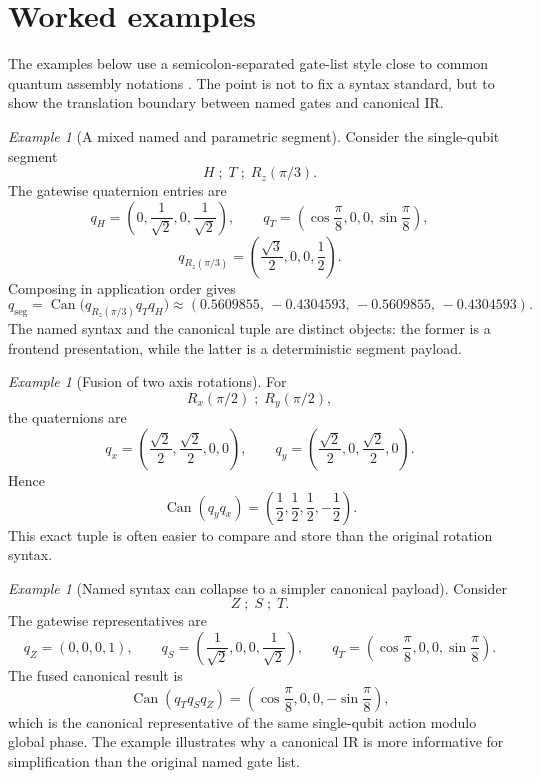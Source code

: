 \documentclass[11pt]{article}
\theoremstyle{remark}
\newtheorem{example}[definition]{Example}
\newcommand{\canon}{\operatorname{Can}}
\begin{document}
\section{Worked examples}

The examples below use a semicolon-separated gate-list style close to common
quantum assembly notations \citep{cross2022,smith2016}. The point is not to
fix a syntax standard, but to show the translation boundary between named gates
and canonical IR.

\begin{example}[A mixed named and parametric segment]
Consider the single-qubit segment
\[
H\;;\;T\;;\;R_z(\pi/3).
\]
The gatewise quaternion entries are
\[
q_H=\left(0,\frac{1}{\sqrt2},0,\frac{1}{\sqrt2}\right),\qquad
q_T=\left(\cos\frac{\pi}{8},0,0,\sin\frac{\pi}{8}\right),
\]
\[
q_{R_z(\pi/3)}=\left(\frac{\sqrt3}{2},0,0,\frac12\right).
\]
Composing in application order gives
\[
q_{\mathrm{seg}}=
\canon\!\bigl(q_{R_z(\pi/3)} q_T q_H\bigr)
\approx
(0.5609855,\,-0.4304593,\,-0.5609855,\,-0.4304593).
\]
The named syntax and the canonical tuple are distinct objects: the former is a
frontend presentation, while the latter is a deterministic segment payload.
\end{example}

\begin{example}[Fusion of two axis rotations]
For
\[
R_x(\pi/2)\;;\;R_y(\pi/2),
\]
the quaternions are
\[
q_x=\left(\frac{\sqrt2}{2},\frac{\sqrt2}{2},0,0\right),\qquad
q_y=\left(\frac{\sqrt2}{2},0,\frac{\sqrt2}{2},0\right).
\]
Hence
\[
\canon(q_y q_x)=\left(\frac12,\frac12,\frac12,-\frac12\right).
\]
This exact tuple is often easier to compare and store than the original
rotation syntax.
\end{example}

\begin{example}[Named syntax can collapse to a simpler canonical payload]
Consider
\[
Z\;;\;S\;;\;T.
\]
The gatewise representatives are
\[
q_Z=(0,0,0,1),\qquad
q_S=\left(\frac{1}{\sqrt2},0,0,\frac{1}{\sqrt2}\right),\qquad
q_T=\left(\cos\frac{\pi}{8},0,0,\sin\frac{\pi}{8}\right).
\]
The fused canonical result is
\[
\canon(q_T q_S q_Z)=\left(\cos\frac{\pi}{8},0,0,-\sin\frac{\pi}{8}\right),
\]
which is the canonical representative of the same single-qubit action modulo
global phase. The example illustrates why a canonical IR is more informative
for simplification than the original named gate list.
\end{example}
\end{document}
